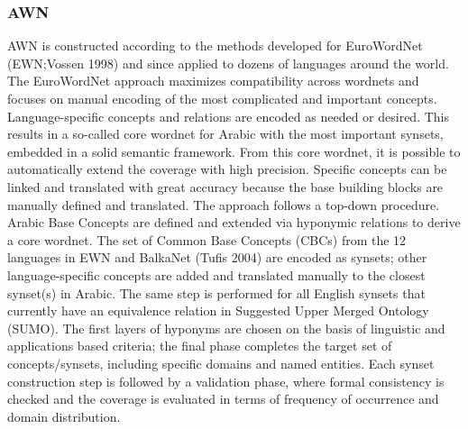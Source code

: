 \subsubsection{AWN}

AWN is constructed according to the methods developed for EuroWordNet (EWN;Vossen 1998) and since applied to dozens of languages around the world. The EuroWordNet approach maximizes compatibility across wordnets and focuses on manual encoding of the most complicated and important concepts. 
Language-specific concepts and relations are encoded as needed or desired. This results in a so-called core wordnet for Arabic with the most important synsets, embedded in a solid semantic framework. From this core wordnet, it is possible to automatically extend the coverage with high precision. Specific concepts can be linked and translated with great accuracy because the base building blocks are manually defined and translated. 
The approach follows a top-down procedure. Arabic Base Concepts are defined and extended via hyponymic relations to derive a core wordnet. The set of Common Base Concepts (CBCs) from the 12 languages in EWN and BalkaNet (Tufis 2004) are encoded as synsets; other language-specific concepts are added and translated manually to the closest synset(s) in Arabic. The same step is performed for all English synsets that currently have an equivalence relation in Suggested Upper Merged Ontology (SUMO).
The first layers of hyponyms are chosen on the basis of linguistic and applications based criteria; the final phase completes the target set of concepts/synsets, including specific domains and named entities. Each synset construction step is followed by a validation phase, where formal consistency is checked and the coverage is evaluated in terms of frequency of occurrence and domain distribution.

